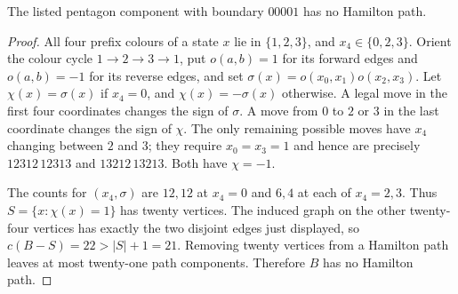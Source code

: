\begin{lemma}
The listed pentagon component with boundary $00001$ has no Hamilton path.
\end{lemma}
\begin{proof}
All four prefix colours of a state $x$ lie in $\{1,2,3\}$, and
$x_4\in\{0,2,3\}$. Orient the colour cycle $1\to2\to3\to1$,
put $o(a,b)=1$ for its forward edges and $o(a,b)=-1$ for its reverse
edges, and set $\sigma(x)=o(x_0,x_1)o(x_2,x_3)$.
Let $\chi(x)=\sigma(x)$ if $x_4=0$, and $\chi(x)=-\sigma(x)$ otherwise.
A legal move in the first four coordinates changes the sign of $\sigma$.
A move from $0$ to $2$ or $3$ in the last coordinate changes the sign
of $\chi$. The only remaining possible moves have $x_4$ changing between
$2$ and $3$; they require $x_0=x_3=1$ and hence are precisely
$12312\,12313$ and $13212\,13213$. Both have $\chi=-1$.

The counts for $(x_4,\sigma)$ are $12,12$ at $x_4=0$ and $6,4$ at
each of $x_4=2,3$. Thus $S=\{x:\chi(x)=1\}$ has twenty vertices.
The induced graph on the other twenty-four vertices has exactly the
two disjoint edges just displayed, so $c(B-S)=22>|S|+1=21$.
Removing twenty vertices from a Hamilton path leaves at most twenty-one
path components. Therefore $B$ has no Hamilton path.
\end{proof}
